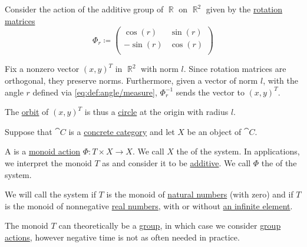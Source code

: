 \begin{example}\label{ex:plane_rotation_action_orbits}
  Consider the action of the additive group of \( \BbbR \) on \( \BbbR^2 \) given by the \hyperref[def:euclidean_transformation/rotation]{rotation} \hyperref[def:array/matrix]{matrices}
  \begin{equation*}
    \Phi_r \coloneqq \begin{pmatrix}
      \cos(r)  & \sin(r) \\
      -\sin(r) & \cos(r) \\
    \end{pmatrix}
  \end{equation*}

  Fix a nonzero vector \( (x, y)^T \) in \( \BbbR^2 \) with norm \( l \). Since rotation matrices are orthogonal, they preserve norms. Furthermore, given a vector of norm \( l \), with the angle \( r \) defined via \eqref{eq:def:angle/measure}, \( \Phi_r^{-1} \) sends the vector to \( (x, y)^T \).

  The \hyperref[def:group_action_orbit]{orbit} of \( (x, y)^T \) is thus a \hyperref[def:quadratic_plane_curve/ellipse]{circle} at the origin with radius \( l \).
\end{example}

\begin{definition}\label{def:dynamical_system}\mimprovised
  Suppose that \( \cat{C} \) is a \hyperref[def:concrete_category]{concrete category} and let \( X \) be an object of \( \cat{C} \).

  A  is a \hyperref[def:monoid_action]{monoid action} \( \Phi: T \times X \to X \). We call \( X \) the  of the system. In applications, we interpret the monoid \( T \) as  and consider it to be \hyperref[rem:additive_magma]{additive}. We call \( \Phi \) the  of the system.

  We will call the system  if \( T \) is the monoid of \hyperref[def:set_of_natural_numbers]{natural numbers} (with zero) and  if \( T \) is the monoid of nonnegative \hyperref[def:set_of_real_numbers]{real numbers}, with or without \hyperref[def:extended_real_numbers]{an infinite element}.

  The monoid \( T \) can theoretically be a \hyperref[def:group]{group}, in which case we consider \hyperref[def:group_action]{group actions}, however negative time is not as often needed in practice.
\end{definition}

